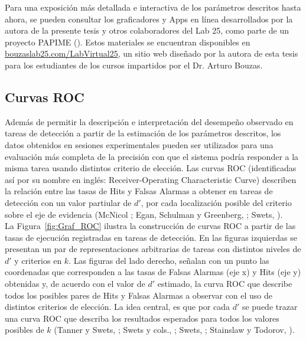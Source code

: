 Para una exposición más detallada e interactiva de los parámetros descritos hasta ahora, se pueden consultar los graficadores y Apps en línea desarrollados por la autora de la presente tesis y otros colaboradores del Lab 25, como parte de un proyecto PAPIME (\citeyear{PAPIME}). Estos materiales se encuentran disponibles en \href{http://www.bouzaslab25.com/LabVirtual25/}{bouzaslab25.com/LabVirtual25}, un sitio web diseñado por la autora de esta tesis para los estudiantes de los cursos impartidos por el Dr. Arturo Bouzas.\\

\subsection{Curvas ROC}

Además de permitir la descripción e interpretación del desempeño observado en tareas de detección a partir de la estimación de los parámetros descritos, los datos obtenidos en sesiones experimentales pueden ser utilizados para una evaluación más completa de la precisión con que el sistema podría responder a la misma tarea usando distintos criterio de elección. Las curvas ROC (identificadas así por su nombre en inglés: Receiver-Operating Characteristic Curve) describen la relación entre las tasas de Hits y Falsas Alarmas a obtener en tareas de detección con un valor partiular de $d'$, por cada localización posible del criterio sobre el eje de evidencia (McNicol \citeyear{McNicol2}; Egan, Schulman y Greenberg, \citeyear{Egan1959}; Swets, \citeyear{Swets1973}).\\

La Figura~\ref{fig:Graf_ROC} ilustra la construcción de curvas ROC a partir de las tasas de ejecución registradas en tareas de detección. En las figuras izquierdas se presentan un par de representaciones arbitrarias de tareas con distintos niveles de $d'$ y criterios en $k$. Las figuras del lado derecho, señalan con un punto las coordenadas que corresponden a las tasas de Falsas Alarmas (eje x) y Hits (eje y) obtenidas y, de acuerdo con el valor de $d'$ estimado, la curva ROC que describe todos los posibles pares de Hits y Falsas Alarmas a observar con el uso de distintos criterios de elección. La idea central, es que por cada $d'$ se puede trazar una curva ROC que describa los resultados esperados para todos los valores posibles de $k$ (Tanner y Swets, \citeyear{Tanner1954}; Swets y cols.,  \citeyear{Swets1961}; Swets, \citeyear{Swets1973}; Stainslaw y Todorov, \citeyear{Stainslaw1999}).\\

